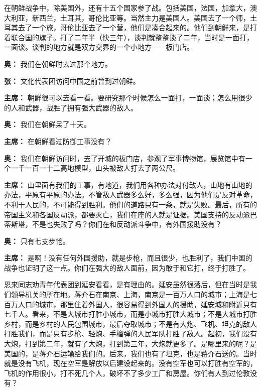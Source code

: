 \begin{duihua}
在朝鲜战争中，除美国外，还有十五个国家参了战。包括美国，法国，加拿大，澳大利亚，新西兰，土耳其，哥伦比亚等。当然主力是美国人。美国去了一个师，土耳其去了一个旅，哥伦比亚去了一个营，他们是凑合起来的。他们到朝鲜来，是打着联合国的旗子。打了二年半（快三年），谈判就整整谈了二年，当时是一面打，一面谈。谈判的地方就是双方交界的一个小地方——板门店。

\item[\textbf{奥：}] 我们在朝鲜时去过那个地方。

\item[\textbf{张：}] 文化代表团访问中国之前曾到过朝鲜。

\item[\textbf{主席：}] 朝鲜很可以去看一看。要研究那个时候怎么一面打，一面谈；怎么用很少的人和武器，战胜了拥有强大武器的敌人。

\item[\textbf{奥：}] 我们在朝鲜呆了十天。

\item[\textbf{主席：}] 在朝鲜看过防御工事没有？

\item[\textbf{奥：}] 我们在朝鲜访问时，去了开城的板门店，参观了军事博物馆，展览馆中有一个一千一百一十二高地模型，山头被敌人打去了两公尺。

\item[\textbf{主席：}] 山里面有我们的工事，有地道，我们用各种办法对付敌人，山地有山地的办法，平原有平原的办法。不管敌人武器多么好，多么强，因为他们是反对革命，不利于人民的，不可能得到胜利。他们的道路只有一条，就是失败。最后，所有的帝国主义和各国反动派，都要灭亡，我们在座的人就是证据。美国支持的反动派巴蒂斯塔，不是也失败了吗？你们在和反动派斗争中，有外国援助没有？

\item[\textbf{奥：}] 只有七支步怆。

\item[\textbf{主席：}] 是啊！没有任何外国援助，就是步枪，而且很少，也胜利了，我们中国的战争也证明了这一点。你们在强大的敌人面前，因为敢于和它打，终于打胜了。

恩来同志劝青年代表团到延安看看，是有理由的。延安虽然很落后，但在当时是我们领导机关的所在地。蒋介石在南京、上海，南京是一百万人口的城市；上海是七百万人口的城市，那里住着外国人，很容易得到外国人的援助，延安城和附近只有七千人。看来，不是大城市打胜小城市，而是小城市打胜大城市；不是大城市打胜乡村，而是乡村的人民包围城市，最后夺取城市；不是有大炮、飞机、坦克的敌人打胜我们，而是只有步枪、轻炮、手榴弹的人民军队打胜了敌人。起初，我们没有大炮，打到第二年，就有了大炮，打到第三年，大炮就更多了。是哪里来的呢？是美国的，是蒋介石运输给我们的。后来，我们也有了坦克，也是蒋介石送的。当时就是没有飞机，现在空军是解放以后建设起来的。没有空军也可以打胜有空军的，飞机的作用很小，打不死几个人，破坏不了多少工厂和房屋。你们有人到过伦敦没有？


\end{duihua}
